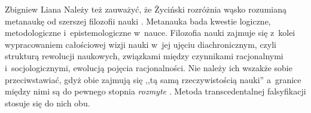 \begin{artplenv}{Zbigniew Liana}
Należy też zauważyć, że Życiński rozróżnia wąsko rozumianą metanaukę od szerszej filozofii nauki
\parencite[s.~14–16]{zycinski_elementy_1996}.
Metanauka bada kwestie logiczne,
metodologiczne i~epistemologiczne w~nauce. Filozofia nauki zajmuje się z~kolei wypracowaniem całościowej wizji nauki w~jej ujęciu
diachronicznym, czyli strukturą rewolucji naukowych, związkami między czynnikami racjonalnymi i~socjologicznymi,
ewolucją pojęcia racjonalności. Nie należy ich wszakże sobie przeciwstawiać, gdyż obie zajmują się ,,tą samą
rzeczywistością nauki'' a~granice między nimi są do pewnego stopnia \textit{rozmyte}
\parencite[s.~16]{zycinski_elementy_1996}.
Metoda transcedentalnej falsyfikacji stosuje się do nich obu.


\end{artplenv}
